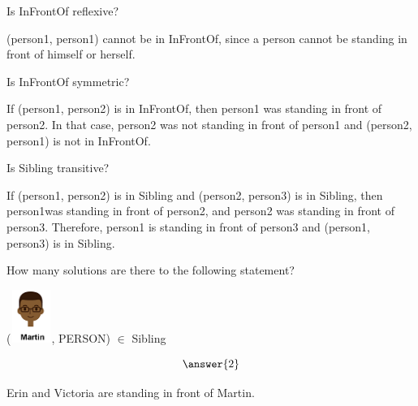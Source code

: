 \documentclass{ximera}
\begin{document}
\begin{exercise}
Is InFrontOf reflexive?

  \begin{multipleChoice}
  \end{multipleChoice}
  \begin{feedback}
  (person1, person1) cannot be in InFrontOf, since a person cannot be standing in front of himself or herself.
  \end{feedback}
\end{exercise}




\begin{exercise}
Is InFrontOf symmetric?

  \begin{multipleChoice}
  \end{multipleChoice}
  \begin{feedback}
  If (person1, person2) is in InFrontOf, then person1 was standing in front of person2.  In that case, person2 was not standing in front of person1 and (person2, person1) is not in InFrontOf.
  \end{feedback}
\end{exercise}





\begin{exercise}
Is Sibling transitive?

  \begin{multipleChoice}
  \end{multipleChoice}
  \begin{feedback}
If (person1, person2) is in Sibling and (person2, person3) is in Sibling, then person1was standing in front of person2, and person2 was standing in front of person3. Therefore, person1 is standing in front of person3 and (person1, person3) is in Sibling.
  \end{feedback}
\end{exercise}




\begin{exercise}
How many solutions are there to the following statement?  

({\includegraphics[width=50px,height=65px]{pics/people/martin.png}}, PERSON) $\in$ Sibling 

\[  \answer{2} \]

  \begin{feedback}
Erin and Victoria are standing in front of Martin.
  \end{feedback}
\end{exercise}
\end{document}
